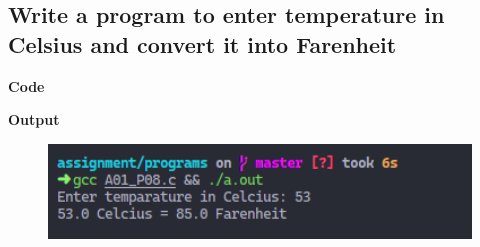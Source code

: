\documentclass[a4paper]{article}
\begin{document}
\newpage



\subsection{Write a program to enter temperature in Celsius and convert it into Farenheit}
\textbf{Code}



\textbf{Output}

\begin{figure}[h]
  \includegraphics[width=12cm]{A01_P08}
\end{figure}

\newpage

\end{document}
